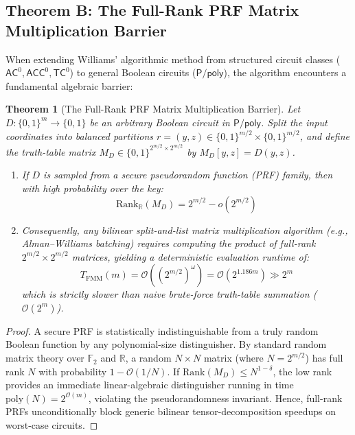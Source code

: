 \documentclass[11pt,a4paper]{article}
\newtheorem{theorem}{Theorem}[section]
\theoremstyle{definition}
\theoremstyle{remark}
\newcommand{\Ppoly}{\mathsf{P/poly}}
\newcommand{\TC}{\mathsf{TC}}
\newcommand{\AC}{\mathsf{AC}}
\newcommand{\ACC}{\mathsf{ACC}}
\newcommand{\poly}{\mathrm{poly}}
\begin{document}
\subsection{Theorem B: The Full-Rank PRF Matrix Multiplication Barrier}

When extending Williams' algorithmic method from structured circuit classes ($\AC^0, \ACC^0, \TC^0$) to general Boolean circuits ($\Ppoly$), the algorithm encounters a fundamental algebraic barrier:

\begin{theorem}[The Full-Rank PRF Matrix Multiplication Barrier]\label{thm:prf_barrier}
Let $D: \{0,1\}^m \to \{0,1\}$ be an arbitrary Boolean circuit in $\Ppoly$. Split the input coordinates into balanced partitions $r = (y, z) \in \{0,1\}^{m/2} \times \{0,1\}^{m/2}$, and define the truth-table matrix $M_D \in \{0,1\}^{2^{m/2} \times 2^{m/2}}$ by $M_D[y, z] = D(y, z)$.
\begin{enumerate}
    \item If $D$ is sampled from a secure pseudorandom function (PRF) family, then with high probability over the key:
    \[
    \mathrm{Rank}_{\mathbb{R}}(M_D) = 2^{m/2} - o(2^{m/2})
    \]
    \item Consequently, any bilinear split-and-list matrix multiplication algorithm (e.g., Alman--Williams batching) requires computing the product of full-rank $2^{m/2} \times 2^{m/2}$ matrices, yielding a deterministic evaluation runtime of:
    \[
    T_{\mathrm{FMM}}(m) = \mathcal{O}\left((2^{m/2})^\omega\right) = \mathcal{O}\left(2^{1.186 m}\right) \gg 2^m
    \]
    which is strictly slower than naive brute-force truth-table summation ($\mathcal{O}(2^m)$).
\end{enumerate}
\end{theorem}

\begin{proof}
A secure PRF is statistically indistinguishable from a truly random Boolean function by any polynomial-size distinguisher. By standard random matrix theory over $\mathbb{F}_2$ and $\mathbb{R}$, a random $N \times N$ matrix (where $N = 2^{m/2}$) has full rank $N$ with probability $1 - \mathcal{O}(1/N)$. If $\mathrm{Rank}(M_D) \le N^{1-\delta}$, the low rank provides an immediate linear-algebraic distinguisher running in time $\poly(N) = 2^{\mathcal{O}(m)}$, violating the pseudorandomness invariant. Hence, full-rank PRFs unconditionally block generic bilinear tensor-decomposition speedups on worst-case circuits.
\end{proof}
\end{document}
